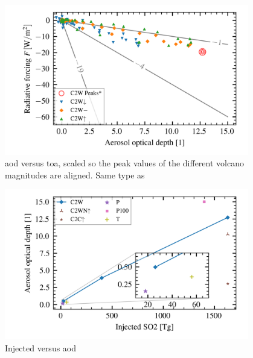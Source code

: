 \documentclass{ametsocV5}
\begin{document}
\begin{figure}
  \begin{center}
    \includegraphics[width=0.95\textwidth]{figures/aod_vs_toa_avg_scaled.png}
  \end{center}
  \caption{
    \acrshort{aod} versus \acrshort{toa}, scaled so the peak values of the different volcano magnitudes
    are aligned. Same type as \cite{gregory2016}
  }
  \label{fig:aod_vs_toa_scaled}
\end{figure}

\begin{figure}
  \begin{center}
    \includegraphics[width=0.95\textwidth]{figures/injection_vs_aod.png}
  \end{center}
  \caption{Injected  versus \acrshort{aod}}
  \label{fig:so2_vs_aod}
\end{figure}
\end{document}
